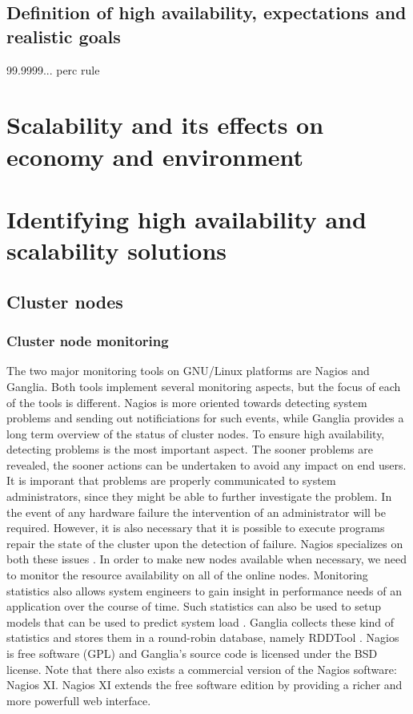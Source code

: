 \documentclass[12pt]{report}
\begin{document}
\section{Definition of high availability, expectations and realistic
  goals}
99.9999... perc rule

\chapter{Scalability and its effects on economy and environment}

\chapter{Identifying high availability and scalability solutions}
\section{Cluster nodes}
\subsection{Cluster node monitoring}
The two major monitoring tools on GNU/Linux platforms are Nagios and
Ganglia. Both tools implement several monitoring aspects, but the
focus of each of the tools is different. Nagios is more oriented
towards detecting system problems and sending out notificiations for
such events, while Ganglia provides a long term overview of the status
of cluster nodes. To ensure high availability, detecting problems is
the most important aspect. The sooner problems are revealed, the
sooner actions can be undertaken to avoid any impact on end users. It
is imporant that problems are properly communicated to system
administrators, since they might be able to further investigate the
problem. In the event of any hardware failure the intervention of
an administrator will be required. However, it is also necessary that
 it is possible to execute programs repair the state of the cluster
 upon the detection of failure. Nagios specializes on both these
 issues \cite{nagios:2013}.
In order to make new nodes available when necessary, we need to
monitor the resource availability on all of the online nodes.
Monitoring statistics also allows system engineers to gain insight in
performance needs of an application over the course of time. 
Such statistics can also be used to setup models that can be used to
predict system load \cite{andreolini:2006}. Ganglia collects these
kind of statistics and stores them in a round-robin database, namely RDDTool
\cite{ganglia:2013} \cite{rrdt:2013}.
Nagios is free software (GPL) and Ganglia's source code is licensed
under the BSD license. Note that there also exists a commercial
version of the Nagios software: Nagios XI. Nagios XI extends the free
software edition by providing a richer and more powerfull web interface.
\end{document}
